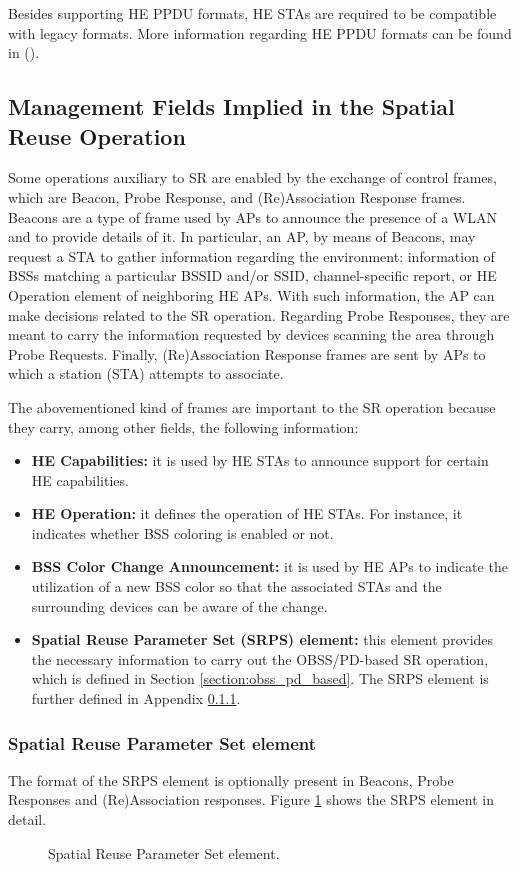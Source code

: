 \documentclass[preprint,12pt]{elsarticle}
\begin{document}
	Besides supporting HE PPDU formats, HE STAs are required to be compatible with legacy formats. More information regarding HE PPDU formats can be found in (\citealp{rhode2017whitepaper}). 
	
	\subsection{Management Fields Implied in the Spatial Reuse Operation}
	Some operations auxiliary to SR are enabled by the exchange of control frames, which are Beacon, Probe Response, and (Re)Association Response frames. Beacons are a type of frame used by APs to announce the presence of a WLAN and to provide details of it. In particular, an AP, by means of Beacons, may request a STA to gather information regarding the environment: information of BSSs matching a particular BSSID and/or SSID, channel-specific report, or HE Operation element of neighboring HE APs. With such information, the AP can make decisions related to the SR operation. Regarding Probe Responses, they are meant to carry the information requested by devices scanning the area through Probe Requests. Finally, (Re)Association Response frames are sent by APs to which a station (STA) attempts to associate.
	
	The abovementioned kind of frames are important to the SR operation because they carry, among other fields, the following information:
	\begin{itemize}
		\item \textbf{HE Capabilities:} it is used by HE STAs to announce support for certain HE capabilities.
		\item \textbf{HE Operation:} it defines the operation of HE STAs. For instance, it indicates whether BSS coloring is enabled or not.
		\item \textbf{BSS Color Change Announcement:} it is used by HE APs to indicate the utilization of a new BSS color so that the associated STAs and the surrounding devices can be aware of the change.
		\item \textbf{Spatial Reuse Parameter Set (SRPS) element:} this element provides the necessary information to carry out the OBSS/PD-based SR operation, which is defined in Section \ref{section:obss_pd_based}. The SRPS element is further defined in Appendix \ref{section:srps}.
	\end{itemize}
	
	\subsubsection{Spatial Reuse Parameter Set element}
	\label{section:srps}
	The format of the SRPS element is optionally present in Beacons, Probe Responses and (Re)Association responses. Figure 	\ref{fig:appendix_2} shows the SRPS element in detail.
	\begin{figure}[ht!]
		\centering
		\caption{Spatial Reuse Parameter Set element.}
		\label{fig:appendix_2}
	\end{figure}
	
\end{document}
